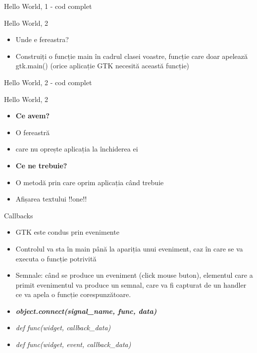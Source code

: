 \documentclass{beamer}
\begin{document}
\begin{frame}{Hello World, 1 - cod complet}
	
\end{frame}

\begin{frame}{Hello World, 2}
\begin{itemize}
	\item Unde e fereastra?
	\item \pause Construiți o funcție main în cadrul clasei voastre, funcție care doar apelează gtk.main() (orice aplicație GTK necesită această funcție)
\end{itemize}
\end{frame}

\begin{frame}{Hello World, 2 - cod complet}
	
\end{frame}

\begin{frame}{Hello World, 2}
\begin{itemize}
	\item \textbf{Ce avem?}
	\item \pause O fereastră
	\item \pause care nu oprește aplicația la închiderea ei
	\item \pause \textbf{Ce ne trebuie?}
	\item \pause O metodă prin care oprim aplicația când trebuie
	\item \pause Afișarea textului !!one!!
\end{itemize}
\end{frame}

\begin{frame}{Callbacks}
\begin{itemize}
	\item GTK este condus prin evenimente
	\item \pause Controlul va sta în main până la apariția unui eveniment, caz în care se va executa o funcție potrivită
	\item \pause Semnale: când se produce un eveniment (click mouse buton), elementul care a primit evenimentul va produce un semnal, care va fi capturat de un handler ce va apela o funcție corespunzătoare.
	\item \pause \textbf{\textit{object.connect(signal\_name, func, data)}}
	\item \pause \textit{def func(widget, callback\_data)}
	\item \pause \textit{def func(widget, event, callback\_data)}
\end{itemize}
\end{frame}
\end{document}
